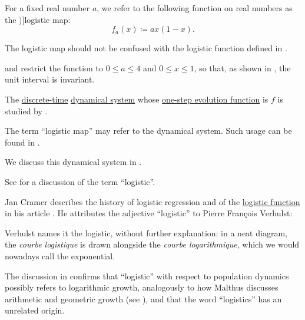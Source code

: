 \begin{definition}\label{def:logistic_map}\mimprovised
  For a fixed real number \( a \), we refer to the following function on real numbers as the \term[en=logistic map (\cite[22]{Müller2022HandbookOfDynamicsAndProbability})]{logistic map}:
  \begin{equation}\label{eq:def:logistic_map}
    f_a(x) \coloneqq a x (1 - x).
  \end{equation}
\end{definition}
\begin{comments}
  \item The logistic map should not be confused with the logistic function defined in .

  \item {} and  restrict the function to \( 0 \leq a \leq 4 \) and \( 0 \leq x \leq 1 \), so that, as shown in , the unit interval is invariant.

  The \hyperref[def:discrete_dynamical_system]{discrete-time} \hyperref[def:dynamical_system]{dynamical system} whose \hyperref[def:one_step_evolution_function]{one-step evolution function} is \( f \) is studied by .

  The term \enquote{logistic map} may refer to the dynamical system. Such usage can be found in \cite[353]{Strogatz1994NonlinearDynamics}.

  We discuss this dynamical system in .

  \item See  for a discussion of the term \enquote{logistic}.
\end{comments}

\begin{remark}\label{rem:logistic_model_etymology}
  Jan Cramer describes the history of logistic regression and of the \hyperref[def:logistic_function]{logistic function} in his article \cite{Cramer2003OriginsOfLogisticRegression}. He attributes the adjective \enquote{logistic} to Pierre Fran\c{c}ois Verhulst:
  \begin{displayquote}
    Verhulst names it the logistic, without further explanation: in a neat diagram, the \textit{courbe logistique} is drawn alongside the \textit{courbe logarithmique}, which we would nowadays call the exponential.
  \end{displayquote}

  The discussion in \cite{HSMSE:logistic_growth_etymology} confirms that \enquote{logistic} with respect to population dynamics possibly refers to logarithmic growth, analogously to how Malthus discusses arithmetic and geometric growth (see ), and that the word \enquote{logistics} has an unrelated origin.
\end{remark}

